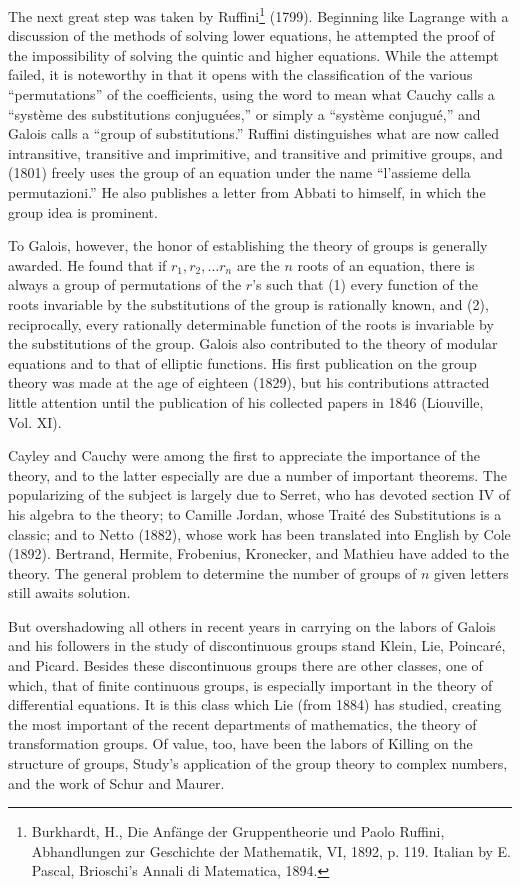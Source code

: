 \documentclass[oneside]{book}
\begin{document}
{The next great step was taken by Ruffini\footnote{Burkhardt, H.,
Die Anf\"ange der Gruppentheorie und Paolo Ruffini, Abhandlungen zur
Geschichte der Mathematik, VI, 1892, p. 119. Italian by E. Pascal,
Brioschi's Annali di Matematica, 1894.} (1799). Beginning like
Lagrange with a discussion of the methods of solving lower
equations, he attempted the proof of the impossibility of solving
the quintic and higher equations. While the attempt failed, it is
noteworthy in that it opens with the classification of the various
``permutations'' of the coefficients, using the word to mean what
Cauchy calls a ``syst\`eme des substitutions conjugu\'ees,'' or
simply a ``syst\`eme conjugu\'e,'' and Galois calls a ``group of
substitutions.'' Ruffini distinguishes what are now called
intransitive, transitive and imprimitive, and transitive and
primitive groups, and (1801) freely uses the group of an equation
under the name ``l'assieme della permutazioni.'' He also publishes a
letter from Abbati to himself, in which the group idea is prominent.

To Galois, however, the honor of establishing the theory of groups
is generally awarded. He found that if $r_1, r_2, \ldots r_n$ are
the $n$ roots of an equation, there is always a group of
permutations of the $r$'s such that (1) every function of the roots
invariable by the substitutions of the group is rationally known,
and (2), reciprocally, every rationally determinable function of the
roots is invariable by the substitutions of the group. Galois also
contributed to the theory of modular equations and to that of
elliptic functions. His first publication on the group theory was
made at the age of eighteen (1829), but his contributions attracted
little attention until the publication of his collected papers in
1846 (Liouville, Vol. XI).

Cayley and Cauchy were among the first to appreciate the importance
of the theory, and to the latter especially are due a number of
important theorems. The popularizing of the subject is largely due
to Serret, who has devoted section IV of his algebra to the theory;
to Camille Jordan, whose Trait\'e des Substitutions is a classic;
and to Netto (1882), whose work has been translated into English by
Cole (1892). Bertrand, Hermite, Frobenius, Kronecker, and Mathieu
have added to the theory. The general problem to determine the
number of groups of $n$ given letters still awaits solution.

But overshadowing all others in recent years in carrying on the
labors of Galois and his followers in the study of discontinuous
groups stand Klein, Lie, Poincar\'e, and Picard. Besides these
discontinuous groups there are other classes, one of which, that of
finite continuous groups, is especially important in the theory of
differential equations. It is this class which Lie (from 1884) has
studied, creating the most important of the recent departments of
mathematics, the theory of transformation groups. Of value, too,
have been the labors of Killing on the structure of groups, Study's
application of the group theory to complex numbers, and the work of
Schur and Maurer.

}
\end{document}
